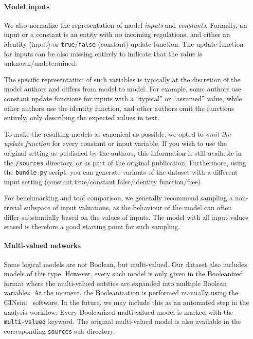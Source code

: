 \documentclass{article}
\begin{document}
\paragraph{Model inputs} We also normalize the representation of model \emph{inputs} and \emph{constants}. Formally, an input or a constant is an entity with no incoming regulations, and either an identity (input) or \texttt{true}/\texttt{false} (constant) update function. The update function for inputs can be also missing entirely to indicate that the value is unknown/undetermined.

The specific representation of such variables is typically at the discretion of the model authors and differs from model to model. For example, some authors use constant update functions for inputs with a ``typical'' or ``assumed'' value, while other authors use the identity function, and other authors omit the functions entirely, only describing the expected values in text.

To make the resulting models as canonical as possible, we opted to \emph{omit the update function} for every constant or input variable. If you wish to use the original setting as published by the authors, this information is still available in the \texttt{/sources} directory, or as part of the original publication. Furthermore, using the \texttt{bundle.py} script, you can generate variants of the dataset with a different input setting (constant true/constant false/identity function/free).

For benchmarking and tool comparison, we generally recommend sampling a non-trivial subspace of input valuations, as the behaviour of the model can often differ substantially based on the values of inputs. The model with all input values erased is therefore a good starting point for such sampling.

\paragraph{Multi-valued networks} Some logical models are not Boolean, but multi-valued. Our dataset also includes models of this type. However, every such model is only given in the Booleanized format where the multi-valued entities are expanded into multiple Boolean variables. At the moment, the Booleanization is performed manually using the GINsim~\cite{ginsim} software. In the future, we may include this as an automated step in the analysis workflow. Every Booleanized multi-valued model is marked with the \texttt{multi-valued} keyword. The original multi-valued model is also available in the corresponding \texttt{sources} sub-directory.
\end{document}
